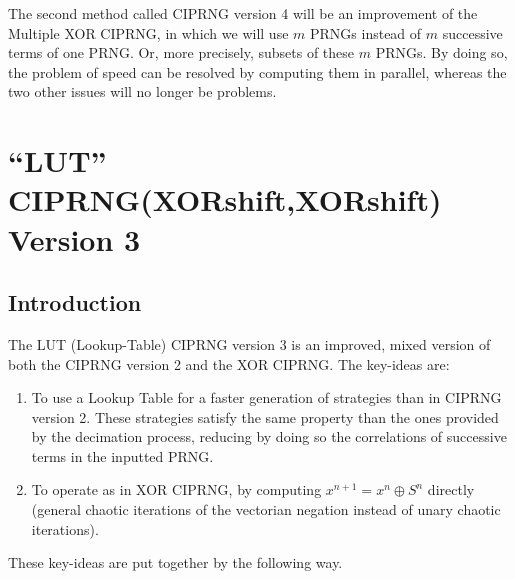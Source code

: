 The second method called CIPRNG version 4 will be an improvement of the Multiple
XOR CIPRNG, in which we will use $m$ PRNGs instead of $m$ successive terms of one
PRNG. Or, more precisely, subsets of these $m$ PRNGs. By doing so, the problem of speed can be resolved by computing them in 
parallel, whereas the two other issues will no longer be problems.


\section{``LUT'' CIPRNG(XORshift,XORshift) Version 3}
\label{LUT CI(XORshift,XORshift) algorithms and example}
\subsection{Introduction}

The LUT (Lookup-Table) CIPRNG version 3 is an improved, mixed version of 
both the CIPRNG version 2 and the XOR CIPRNG. The key-ideas are:
\begin{enumerate}
\item To use a Lookup Table for a faster generation of strategies than in CIPRNG version 2. 
These strategies satisfy the same property than the ones provided by the decimation process, reducing by doing so the correlations of successive terms in the inputted PRNG.
\item To operate as in XOR CIPRNG, by computing $x^{n+1} = x^n \oplus S^n$ directly
(general chaotic iterations of the vectorian negation instead of unary 
chaotic iterations).
\end{enumerate}
These key-ideas are put together by the following way.

